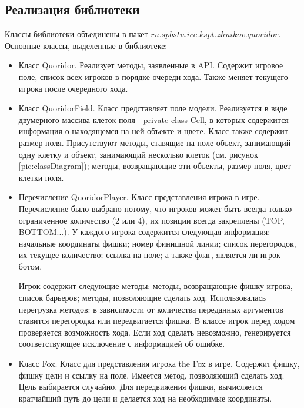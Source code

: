 \documentclass[a4paper]{article}
\begin{document}
\subsection{Реализация библиотеки}
\noindent Классы библиотеки объединены в пакет $ru.spbstu.icc.kspt.zhuikov.quoridor$. Основные классы, выделенные в библиотеке:
\begin{itemize}

\item Класс Quoridor. Реализует методы, заявленные  в API. Содержит игровое поле, список всех игроков в порядке очереди хода. Также меняет текущего игрока после очередного хода. 

\item Класс QuoridorField. Класс представляет поле модели. Реализуется в виде двумерного массива клеток поля - private class Cell, в которых содержится информация о находящемся на ней объекте и цвете. Класс также содержит размер поля. Присутствуют методы, ставящие на поле объект, занимающий одну клетку и объект, занимающий несколько клеток (см. рисунок \ref{pic:classDiagram}); методы, возвращающие эти объекты, размер поля, цвет клетки поля.

\item Перечисление QuoridorPlayer. Класс представления игрока в игре. Перечисление было выбрано потому, что игроков может быть всегда только ограниченное количество (2 или 4), их позиции всегда закреплены (TOP, BOTTOM...). У каждого игрока содержится следующая информация: начальные координаты фишки; номер финишной линии; список перегородок, их текущее количество; ссылка на поле; а также флаг, является ли игрок ботом. 

Игрок содержит следующие методы: методы, возвращающие фишку игрока, список барьеров; методы, позволяющие сделать ход. Использовалась перегрузка методов: в зависимости от количества переданных аргументов ставится перегородка или передвигается фишка. В классе игрок перед ходом проверяется возможность хода. Если ход сделать невозможно, генерируется соответствующее исключение с информацией об ошибке.

\item Класс Fox. Класс для представления игрока the Fox в игре. Содержит фишку, фишку цели и ссылку на поле. Имеется метод, позволяющий сделать ход. Цель выбирается случайно. Для передвижения фишки, вычисляется кратчайший путь до цели и делается ход на необходимые координаты.


\end{itemize}
\end{document}
